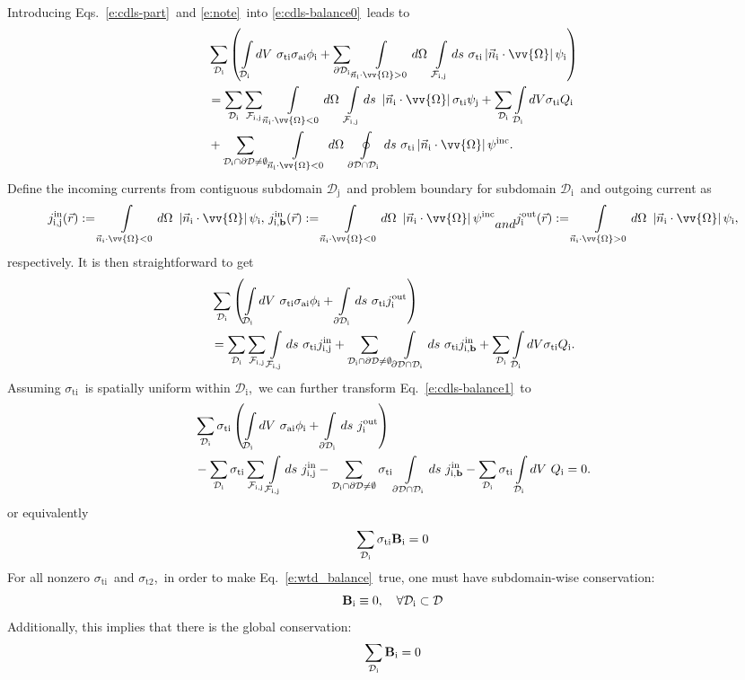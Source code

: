 \documentclass[review]{elsarticle}
\newcommand{\sti}{\sigma_\mm{ti}}
\newcommand{\nno}{\nonumber}
\newcommand{\psii}[1]{\psi^\mathrm{inc}_\mathrm{{#1}}}
\newcommand{\mm}[1]{\mathrm{#1}}
\newcommand{\pd}{{\partial\mathcal{D}}}
\newcommand{\intli}[1]{\int\limits_{{#1}}}
\newcommand{\ointli}[1]{\oint\limits_{{#1}}}
\newcommand{\dii}{{\mathcal{D}_\mathrm{i}}}
\newcommand{\djj}{{\mathcal{D}_\mathrm{j}}}
\newcommand{\fij}{{\mathcal{F}_\mathrm{i,j}}}
\newcommand{\pdi}{{\partial\mathcal{D}_\mathrm{i}}}
\newcommand{\slim}[1]{\sum\limits_{\tiny#1}}
\newcommand{\nido}{\vec{n}_\mathrm{i}\cdot\ome}
\newcommand{\absnido}{\left|\nido\right|}
\newcommand{\sttwo}{{\sigma_\mathrm{t2}}}
\newcommand{\ome}{\vv{\Omega}}
\newcommand{\dome}{d\Omega}
\begin{document}
{\begin{align}
\end{align}
Introducing Eqs.\ \eqref{e:cdls-part}\ and \eqref{e:note}\ into \eqref{e:cdls-balance0}\ leads to
\begin{align}
&\slim{\dii}\left(\intli{\dii}dV\ \sti\sigma_\mm{ai}\phi_\mm{i}+\slim{\pdi}\intli{\nido>0}d\Omega\ \intli{\fij}ds\  \sti\absnido\psi_\mathrm{i}\right)\nno\\
&=\slim{\dii}\slim{\fij}\intli{\nido<0}d\Omega\ \intli{\fij}ds\  \absnido\sti\psi_\mathrm{j}+\slim{\dii}\intli{\dii}dV \sti Q_\mathrm{i}\\
&+{\slim{\dii\cap\pd\neq\emptyset}\intli{\nido<0}d\Omega\ \ointli{\pd\cap\dii}ds\ \sigma_\mm{ti}\absnido\psii{}.}\nno
\end{align}
Define the incoming currents from contiguous subdomain $\djj$\ and problem boundary for subdomain $\dii$\ and outgoing current as
\begin{subequations}
\begin{align}
j_\mm{i,j}^\mm{in}(\vec{r}):=\intli{\nido<0}\dome\ \absnido\psi_\mm{i},
\end{align}
~
\begin{align}
j_\mm{i,{\bf b}}^\mm{in}(\vec{r}):=\intli{\nido<0}\dome\ \absnido\psii{}
\end{align}
and
\begin{align}
j_\mm{i}^\mm{out}(\vec{r}):=\intli{\nido>0}\dome\ \absnido\psi_\mm{i},
\end{align}
\end{subequations}
respectively. It is then straightforward to get
\begin{align}\label{e:cdls-balance1}
&\slim{\dii}\left(\intli{\dii}dV\ \sti\sigma_\mm{ai}\phi_\mm{i}+\intli{\pdi}ds\  \sti j_\mm{i}^\mm{out}\right)\nno\\
&=\slim{\dii}\slim{\fij}\intli{\fij}ds\  \sti j_\mm{i,j}^\mm{in}+{\slim{\dii\cap\pd\neq\emptyset}\intli{\pd\cap\dii}ds\ \sigma_\mm{ti}j_\mm{i,{\bf b}}^\mm{in}}+\slim{\dii}\intli{\dii}dV \sti Q_\mathrm{i}.
\end{align}
Assuming $\sti$\ is spatially uniform within $\dii$,\ we can further transform Eq.\ \eqref{e:cdls-balance1}\ to
\begin{align}\label{e:cdls-balance2}
&\slim{\dii}\sti\left(\intli{\dii}dV\ \sigma_\mm{ai}\phi_\mm{i}+\intli{\pdi}ds\ j_\mm{i}^\mm{out}\right)\nno\\
&-\slim{\dii}\sti\slim{\fij}\intli{\fij}ds\   j_\mm{i,j}^\mm{in}-{\slim{\dii\cap\pd\neq\emptyset}\sti\intli{\pd\cap\dii}ds\ j_\mm{i,{\bf b}}^\mm{in}}-\slim{\dii}\sti\intli{\dii}dV\ Q_\mathrm{i}=0.
\end{align}
or equivalently
\begin{align}\label{e:wtd_balance}
\slim{\dii}\sti{\bf B}_\mm{i}=0
\end{align}
For all nonzero $\sti$\ and $\sttwo$,\ in order to make Eq.\ \eqref{e:wtd_balance}\ true, one must have subdomain-wise conservation:
\begin{equation}\label{e:wted-conservation}
{\bf B}_\mm{i}\equiv0,\quad\forall\dii\subset\mathcal{D}
\end{equation}
Additionally, this implies that there is the global conservation:
\begin{align}
\slim{\dii}{\bf B}_\mm{i}=0
\end{align}
}
\end{document}
